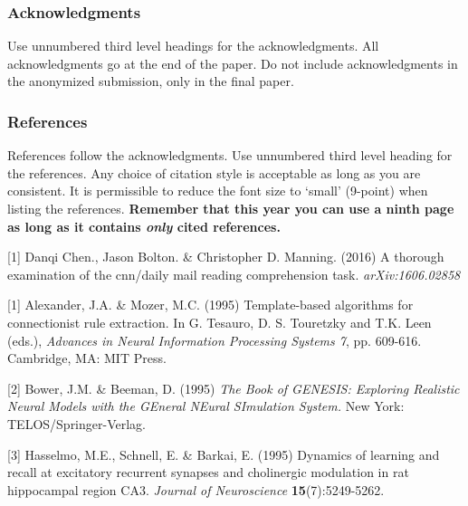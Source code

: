 \documentclass{article} %
\begin{document}
\subsubsection*{Acknowledgments}

Use unnumbered third level headings for the acknowledgments. All
acknowledgments go at the end of the paper. Do not include
acknowledgments in the anonymized submission, only in the
final paper.

\subsubsection*{References}

References follow the acknowledgments. Use unnumbered third level heading for
the references. Any choice of citation style is acceptable as long as you are
consistent. It is permissible to reduce the font size to `small' (9-point)
when listing the references. {\bf Remember that this year you can use
a ninth page as long as it contains \emph{only} cited references.}

\small{
[1] Danqi Chen., Jason Bolton. \& Christopher D. Manning. (2016) A thorough examination of the cnn/daily mail reading comprehension task. {\it arXiv:1606.02858}



[1] Alexander, J.A. \& Mozer, M.C. (1995) Template-based algorithms
for connectionist rule extraction. In G. Tesauro, D. S. Touretzky
and T.K. Leen (eds.), {\it Advances in Neural Information Processing
Systems 7}, pp. 609-616. Cambridge, MA: MIT Press.

[2] Bower, J.M. \& Beeman, D. (1995) {\it The Book of GENESIS: Exploring
Realistic Neural Models with the GEneral NEural SImulation System.}
New York: TELOS/Springer-Verlag.

[3] Hasselmo, M.E., Schnell, E. \& Barkai, E. (1995) Dynamics of learning
and recall at excitatory recurrent synapses and cholinergic modulation
in rat hippocampal region CA3. {\it Journal of Neuroscience}
{\bf 15}(7):5249-5262.
}
\end{document}
